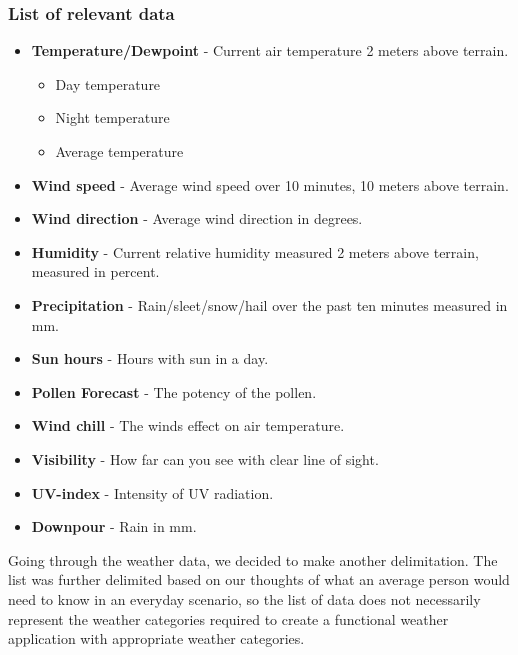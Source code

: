 

\subsubsection*{List of relevant data} %
\label{ssub:list_of_relevant_data}

\begin{itemize}
     \item \textbf{Temperature/Dewpoint} - Current air temperature 2 meters above terrain.
     \begin{itemize}
         \item Day temperature
         \item Night temperature
         \item Average temperature
     \end{itemize}
     \item \textbf{Wind speed} - Average wind speed over 10 minutes, 10 meters above terrain.
     \item \textbf{Wind direction} - Average wind direction in degrees.
     \item \textbf{Humidity} - Current relative humidity measured 2 meters above terrain, measured in percent.
     \item \textbf{Precipitation} - Rain/sleet/snow/hail over the past ten minutes measured in mm.
     \item \textbf{Sun hours} - Hours with sun in a day.
     \item \textbf{Pollen Forecast} - The potency of the pollen.
     \item \textbf{Wind chill} - The winds effect on air temperature.
     \item \textbf{Visibility} - How far can you see with clear line of sight.
     \item \textbf{UV-index} - Intensity of UV radiation.
     \item \textbf{Downpour} - Rain in mm.
 \end{itemize}

Going through the weather data, we decided to make another delimitation. 
The list was further delimited based on our thoughts of what an average person would need to know in an everyday scenario, so the list of data does not necessarily represent the weather categories required to create a functional weather application with appropriate weather categories. 



